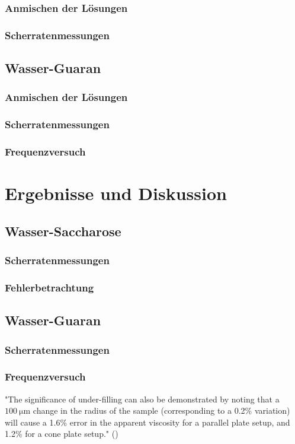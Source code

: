 \documentclass[11pt,a4paper,oneside]{scrartcl}
\begin{document}
\subsubsection{Anmischen der Lösungen}
\subsubsection{Scherratenmessungen}
\subsection{Wasser-Guaran}
\subsubsection{Anmischen der Lösungen}
\subsubsection{Scherratenmessungen}
\subsubsection{Frequenzversuch}
\section{Ergebnisse und Diskussion}
\subsection{Wasser-Saccharose}
\subsubsection{Scherratenmessungen}
\subsubsection{Fehlerbetrachtung}
\subsection{Wasser-Guaran}
\subsubsection{Scherratenmessungen}
\subsubsection{Frequenzversuch}
\cite{versuchsanleitung}
\cite{Stadler2014}
\cite{Hellström_2015}
\cite{Arian2021}
"The significance of under-filling can also be demonstrated by
noting that a $100\ \mathrm{\mu m}$ change in the radius of the sample (corresponding to a 0.2\% variation) will cause a 1.6\% error in the
apparent viscosity for a parallel plate setup, and 1.2\% for a
cone plate setup." (\cite{Hellström_2015})
\end{document}
